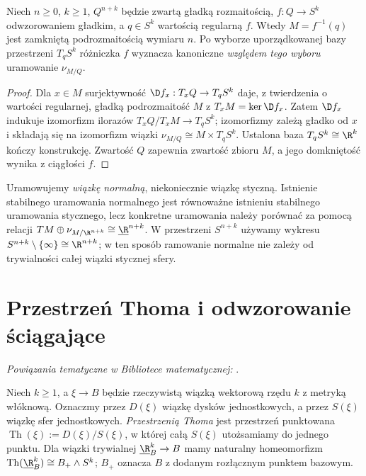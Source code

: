 \begin{lemat}
\label{lem:pt-regular-v9}
Niech $n\ge0$, $k\ge1$, $Q^{n+k}$ będzie
zwartą gładką rozmaitością, $f:Q\to S^k$
odwzorowaniem gładkim, a $q\in S^k$
wartością regularną $f$. Wtedy $M=f^{-1}(q)$
jest zamkniętą podrozmaitością wymiaru $n$.
Po wyborze uporządkowanej bazy przestrzeni $T_qS^k$
różniczka $f$ wyznacza kanoniczne \emph{względem tego
wyboru} uramowanie $\nu_{M/Q}$.
\end{lemat}
\begin{proof}
Dla $x\in M$ surjektywność
$\D f_x:T_xQ\to T_qS^k$ daje, z twierdzenia o wartości
regularnej, gładką podrozmaitość $M$ z
$T_xM=\ker\D f_x$. Zatem $\D f_x$ indukuje
izomorfizm ilorazów
$T_xQ/T_xM\to T_qS^k$; izomorfizmy zależą gładko od
$x$ i składają się na izomorfizm wiązki
$\nu_{M/Q}\cong M\times T_qS^k$.
Ustalona baza $T_qS^k\cong\R^k$ kończy konstrukcję.
Zwartość $Q$ zapewnia zwartość zbioru $M$, a jego
domkniętość wynika z ciągłości $f$.
\end{proof}

\begin{uwaga}
Uramowujemy \emph{wiązkę normalną}, niekoniecznie
wiązkę styczną. Istnienie stabilnego uramowania normalnego
jest równoważne istnieniu stabilnego uramowania stycznego,
lecz konkretne uramowania należy porównać za pomocą relacji
$TM\oplus\nu_{M/\R^{n+k}}\cong\underline\R^{n+k}$.
W przestrzeni $S^{n+k}$ używamy wykresu
$S^{n+k}\setminus\{\infty\}\cong\R^{n+k}$;
w ten sposób ramowanie normalne nie zależy od trywialności
całej wiązki stycznej sfery.
\end{uwaga}

\section{Przestrzeń Thoma i odwzorowanie ściągające}

\noindent\emph{Powiązania tematyczne w Bibliotece matematycznej:} .

\begin{definicja}
Niech $k\ge1$, a $\xi\to B$ będzie rzeczywistą
wiązką wektorową rzędu $k$ z metryką włóknową.
Oznaczmy przez $D(\xi)$ wiązkę dysków
jednostkowych, a przez $S(\xi)$
wiązkę sfer jednostkowych. \emph{Przestrzenią Thoma} jest
przestrzeń punktowana
$\operatorname{Th}(\xi):=D(\xi)/S(\xi)$,
w której całą $S(\xi)$ utożsamiamy do jednego punktu.
Dla wiązki trywialnej
$\underline\R^k_B\to B$ mamy naturalny homeomorfizm
$\operatorname{Th}(\underline\R^k_B)\cong B_+\wedge S^k$;
$B_+$ oznacza $B$ z dodanym rozłącznym punktem bazowym.
\end{definicja}

